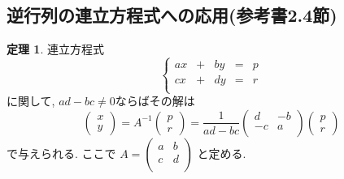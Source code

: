 \documentclass[dvipdfmx,a4paper,11pt]{article}
\theoremstyle{definition}
\newtheorem{thm}{定理}
\begin{document}
\subsection{逆行列の連立方程式への応用(参考書2.4節)}



\begin{tcolorbox}[
    colback = white,
    colframe = green!35!black,
    fonttitle = \bfseries,
    breakable = true]
    \begin{thm}
連立方程式
$$
 \left\{ 
\begin{matrix}
ax&+&by&= &p \\
cx&+&dy&= &r \\
\end{matrix}
\right.
$$
に関して, $ad-bc \neq 0$ならばその解は
$$
 \begin{pmatrix}
 x \\
 y
 \end{pmatrix} 
 = A^{-1}
  \begin{pmatrix}
 p \\
 r
 \end{pmatrix} 
 =
  \frac{1}{ad-bc}
 \begin{pmatrix}
 d& -b  \\
 -c& a  \\
 \end{pmatrix} 
   \begin{pmatrix}
 p \\
 r
 \end{pmatrix} 
$$
で与えられる. 
ここで
 $A=
  \begin{pmatrix}
 a& b  \\
 c& d  \\
 \end{pmatrix} 
 $
 と定める.
    \end{thm}
 \end{tcolorbox}
 
\end{document}
